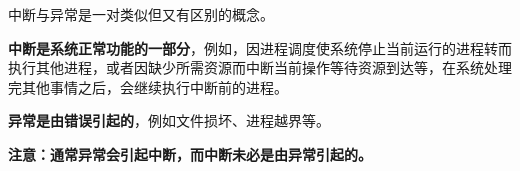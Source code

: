 中断与异常是一对类似但又有区别的概念。

\textbf{中断是系统正常功能的一部分}，例如，因进程调度使系统停止当前运行的进程转而执行其他进程，或者因缺少所需资源而中断当前操作等待资源到达等，在系统处理完其他事情之后，会继续执行中断前的进程。

\textbf{异常是由错误引起的}，例如文件损坏、进程越界等。

\textbf{{注意：通常异常会引起中断，而中断未必是由异常引起的。}}
